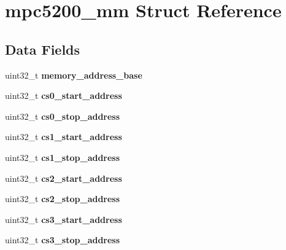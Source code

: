 \hypertarget{structmpc5200__mm}{}\section{mpc5200\+\_\+mm Struct Reference}
\label{structmpc5200__mm}
\subsection*{Data Fields}
\begin{DoxyCompactItemize}
\item 
\mbox{\label{structmpc5200__mm_aa245c4193d595594c1a2d50d607da09f}} 
uint32\+\_\+t {\bfseries memory\+\_\+address\+\_\+base}
\item 
\mbox{\label{structmpc5200__mm_a2fac6ce2f047d9726b546f8e67dbf0ff}} 
uint32\+\_\+t {\bfseries cs0\+\_\+start\+\_\+address}
\item 
\mbox{\label{structmpc5200__mm_ac492b8ffb1c942affbfd94eed64710d7}} 
uint32\+\_\+t {\bfseries cs0\+\_\+stop\+\_\+address}
\item 
\mbox{\label{structmpc5200__mm_a342676ea8b3771aaf4dcb966d0d8c151}} 
uint32\+\_\+t {\bfseries cs1\+\_\+start\+\_\+address}
\item 
\mbox{\label{structmpc5200__mm_af66109b79dfd753afe38b30ba10d3337}} 
uint32\+\_\+t {\bfseries cs1\+\_\+stop\+\_\+address}
\item 
\mbox{\label{structmpc5200__mm_aa47a69f8fd65fc1a2616e6f71ad074e9}} 
uint32\+\_\+t {\bfseries cs2\+\_\+start\+\_\+address}
\item 
\mbox{\label{structmpc5200__mm_a98dc8a036d6bddd26a3b20594b113ce0}} 
uint32\+\_\+t {\bfseries cs2\+\_\+stop\+\_\+address}
\item 
\mbox{\label{structmpc5200__mm_a4da1695ee6094ecbe942817c79cf8ae6}} 
uint32\+\_\+t {\bfseries cs3\+\_\+start\+\_\+address}
\item 
\mbox{\label{structmpc5200__mm_af5c1864b27031785be84beef3f740c76}} 
uint32\+\_\+t {\bfseries cs3\+\_\+stop\+\_\+address}

\end{DoxyCompactItemize}
